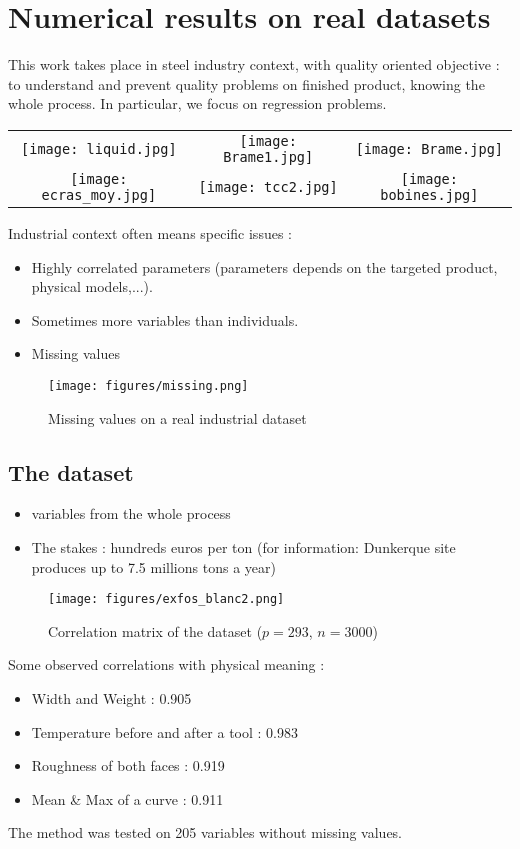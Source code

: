 \documentclass[11pt,a4paper]{article}
\begin{document}
\section{Numerical results on real datasets}
This work takes place in steel industry context, with quality oriented objective : to understand and prevent quality problems on finished product, knowing the whole process. In particular, we focus on regression problems.
        \begin{center}
          \begin{tabular}{ccc}
         \texttt{[image: liquid.jpg]} & \texttt{[image: Brame1.jpg]} & \texttt{[image: Brame.jpg]} \\
          	\texttt{[image: ecras\_moy.jpg]} &\texttt{[image: tcc2.jpg]} & \texttt{[image: bobines.jpg]}
          \end{tabular}
        \end{center}
        Industrial context often means specific issues :
  \begin{itemize}
			\item Highly correlated parameters (parameters depends on the targeted product, physical models,...).
			\item Sometimes more variables than individuals.
			\item Missing values
		\end{itemize}
				\begin{figure}[h]
		\caption{Missing values on a real industrial dataset}
		\centering
		\texttt{[image: figures/missing.png]} \label{missingplot}
		\end{figure}
		
\subsection{The dataset}
		\begin{itemize}
			\item variables from the whole process
			\item The stakes : hundreds euros per ton (for information: Dunkerque site produces up to 7.5 millions tons a year)
		\end{itemize}
		
		
		\begin{figure}[hbtp]
			\caption{Correlation matrix of the dataset ($p=293$, $n=3000$)}
			\centering
			\texttt{[image: figures/exfos\_blanc2.png]}
			\end{figure}
			Some observed correlations with physical meaning :
			\begin{itemize}
				\item Width and Weight : 0.905
				\item Temperature before and after a tool : 0.983 
				\item Roughness of both faces : 0.919
				\item Mean \& Max of a curve : 0.911
			\end{itemize}
		The method was tested on 205 variables without missing values.		
		
\end{document}
